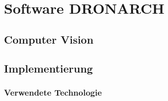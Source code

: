 \chapter{Software DRONARCH}
	\section{Computer Vision}
	\section{Implementierung}
		\subsection{Verwendete Technologie}